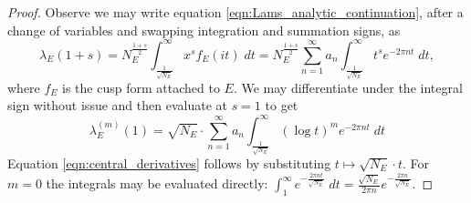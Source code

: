 \begin{proof}
Observe we may write equation \ref{eqn:Lams_analytic_continuation}, after a change of variables and swapping integration and summation signs, as
\begin{equation*}
\lambda_E(1+s) = N_E^{\frac{1+s}{2}}  \int_{\frac{1}{\sqrt{N_E}}}^{\infty} x^s f_E(it) \; dt  = N_E^{\frac{1+s}{2}}  \sum_{n=1}^\infty a_n \int_{\frac{1}{\sqrt{N_E}}}^{\infty} t^s e^{-2\pi nt} \; dt,
\end{equation*}
where $f_E$ is the cusp form attached to $E$. We may differentiate under the integral sign without issue and then evaluate at $s=1$ to get
\begin{equation}\label{eqn:lambda_derivs}
\lambda_E^{(m)}(1) = \sqrt{N_E}\cdot \sum_{n=1}^\infty a_n \int_{\frac{1}{\sqrt{N_E}}}^{\infty} (\log t)^m e^{-2\pi n t} \; dt
\end{equation}
Equation \ref{eqn:central_derivatives} follows by substituting $t \mapsto \sqrt{N_E} \cdot t$. For $m=0$ the integrals may be evaluated directly: $\int_{1}^{\infty} e^{-\frac{2\pi n t}{\sqrt{N_E}}} \; dt = \frac{\sqrt{N_E}}{2\pi n} e^{-\frac{2\pi n}{\sqrt{N_E}}}$.
\end{proof}


